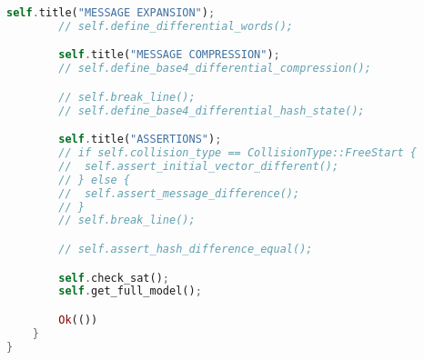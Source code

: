 \begin{lstlisting}[language=rust, caption={smt\_lib/encodings/base4.rs}]
		self.title("MESSAGE EXPANSION");
		// self.define_differential_words();

		self.title("MESSAGE COMPRESSION");
		// self.define_base4_differential_compression();

		// self.break_line();
		// self.define_base4_differential_hash_state();

		self.title("ASSERTIONS");
		// if self.collision_type == CollisionType::FreeStart {
		// 	self.assert_initial_vector_different();
		// } else {
		// 	self.assert_message_difference();
		// }
		// self.break_line();

		// self.assert_hash_difference_equal();

		self.check_sat();
		self.get_full_model();

		Ok(())
	}
}
\end{lstlisting}


